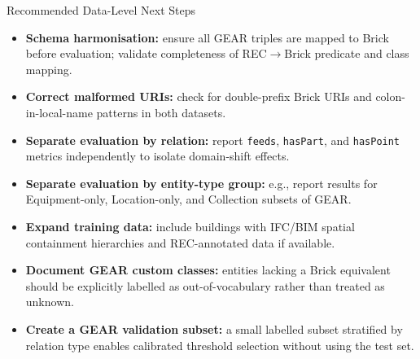 \documentclass[10pt]{beamer}
\begin{document}
\begin{frame}{Recommended Data-Level Next Steps}
  \begin{itemize}
    \item \textbf{Schema harmonisation:} ensure all GEAR triples are mapped to Brick before
          evaluation; validate completeness of REC$\to$Brick predicate and class mapping.
    \item \textbf{Correct malformed URIs:} check for double-prefix Brick URIs and
          colon-in-local-name patterns in both datasets.
    \item \textbf{Separate evaluation by relation:} report \texttt{feeds}, \texttt{hasPart},
          and \texttt{hasPoint} metrics independently to isolate domain-shift effects.
    \item \textbf{Separate evaluation by entity-type group:} e.g., report results
          for Equipment-only, Location-only, and Collection subsets of GEAR.
    \item \textbf{Expand training data:} include buildings with IFC/BIM spatial containment
          hierarchies and REC-annotated data if available.
    \item \textbf{Document GEAR custom classes:} entities lacking a Brick equivalent
          should be explicitly labelled as out-of-vocabulary rather than treated as unknown.
    \item \textbf{Create a GEAR validation subset:} a small labelled subset stratified by
          relation type enables calibrated threshold selection without using the test set.
  \end{itemize}
\end{frame}
\end{document}
